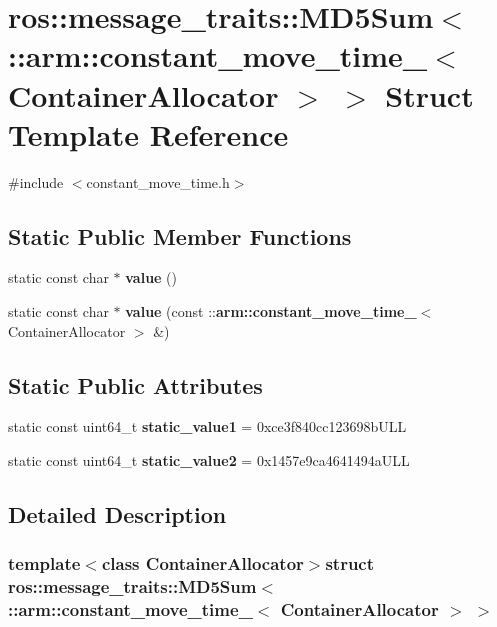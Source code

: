 \section{ros\-:\-:message\-\_\-traits\-:\-:\-M\-D5\-Sum$<$ \-:\-:arm\-:\-:constant\-\_\-move\-\_\-time\-\_\-$<$ \-Container\-Allocator $>$ $>$ \-Struct \-Template \-Reference}
\label{structros_1_1message__traits_1_1MD5Sum_3_01_1_1arm_1_1constant__move__time___3_01ContainerAllocator_01_4_01_4}


{\ttfamily \#include $<$constant\-\_\-move\-\_\-time.\-h$>$}

\subsection*{\-Static \-Public \-Member \-Functions}
\begin{DoxyCompactItemize}
\item 
static const char $\ast$ {\bf value} ()
\item 
static const char $\ast$ {\bf value} (const \-::{\bf arm\-::constant\-\_\-move\-\_\-time\-\_\-}$<$ \-Container\-Allocator $>$ \&)
\end{DoxyCompactItemize}
\subsection*{\-Static \-Public \-Attributes}
\begin{DoxyCompactItemize}
\item 
static const uint64\-\_\-t {\bf static\-\_\-value1} = 0xce3f840cc123698b\-U\-L\-L
\item 
static const uint64\-\_\-t {\bf static\-\_\-value2} = 0x1457e9ca4641494a\-U\-L\-L
\end{DoxyCompactItemize}


\subsection{\-Detailed \-Description}
\subsubsection*{template$<$class Container\-Allocator$>$struct ros\-::message\-\_\-traits\-::\-M\-D5\-Sum$<$ \-::arm\-::constant\-\_\-move\-\_\-time\-\_\-$<$ Container\-Allocator $>$ $>$}



